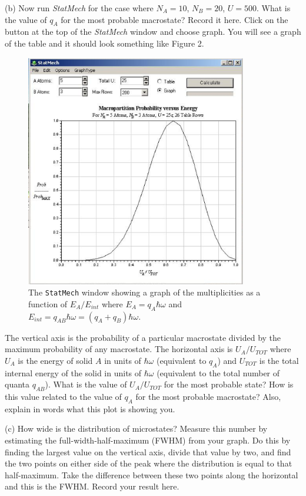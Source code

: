 (b) Now run {\it StatMech} for the case where $N_A = 10$, $N_B=20$, $U = 500$.
What is the value of $q_A$ for the most probable macrostate? 
Record it here.
Click on the button at the top of the {\it StatMech} window and choose graph.
You will see a graph of the table  and it should look something like
Figure 2.
\begin{figure}[!ht]
\begin{center}
\includegraphics[height=4.0in]{einstein_solid/statmech2.eps}
\caption{The {\tt StatMech} window showing a graph of the multiplicities as a function
of $E_A/E_{int}$ where $E_A = q_A \hbar \omega$ and 
$E_{int} = q_{AB} \hbar \omega = (q_A+q_B)\hbar \omega$.}
\end{center}
\end{figure}
The vertical axis is the probability of a particular macrostate divided by the maximum
probability of any macrostate.
The horizontal axis is  $U_A/U_{TOT}$ where 
$U_A$ is the energy of solid $A$ in units of $\hbar\omega$ (equivalent to $q_A$) and $U_{TOT}$ is the total
internal energy of the solid in units of $\hbar\omega$ (equivalent 
to the total number of quanta $q_{AB}$).
What is the value of $U_A/U_{TOT}$ for the most probable state?
How is this value related to the value of $q_A$ for the most probable macrostate? 
Also, explain in words what this plot is showing you.
\vspace{25mm}

(c) How wide is the distribution of microstates?
Measure this number by estimating the full-width-half-maximum (FWHM) from your graph.
Do this by finding the largest value on the vertical axis, divide that value by two, and find
the two points on either side of the peak where the distribution is equal to that
half-maximum.
Take the difference between these two points along the horizontal and this is the FWHM.
Record your result here.
\answerspace{20mm}

